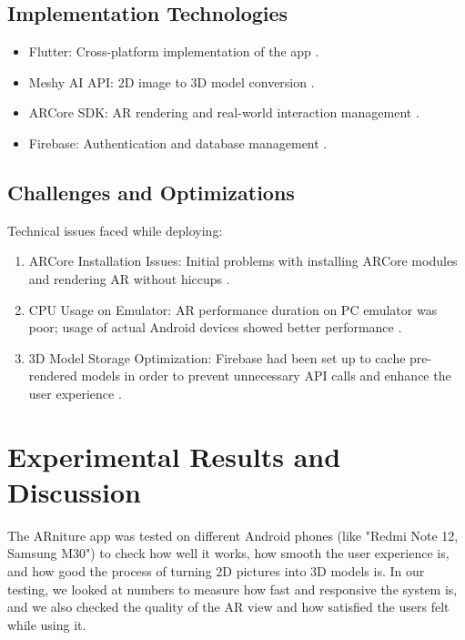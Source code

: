 \documentclass[12pt, a4paper]{article}
\begin{document}
\subsection{Implementation Technologies}
\begin{itemize}
    \item Flutter: Cross-platform implementation of the app \cite{ref3}.
    \item Meshy AI API: 2D image to 3D model conversion \cite{ref5}.
    \item ARCore SDK: AR rendering and real-world interaction management \cite{ref2}.
    \item Firebase: Authentication and database management \cite{ref4}.
\end{itemize}

\subsection{Challenges and Optimizations}
Technical issues faced while deploying:
\begin{enumerate}
    \item ARCore Installation Issues: Initial problems with installing ARCore modules and rendering AR without hiccups \cite{ref17}.
    \item CPU Usage on Emulator: AR performance duration on PC emulator was poor; usage of actual Android devices showed better performance \cite{ref9}.
    \item 3D Model Storage Optimization: Firebase had been set up to cache pre-rendered models in order to prevent unnecessary API calls and enhance the user experience \cite{ref19}.
\end{enumerate}

\section{Experimental Results and Discussion}
The ARniture app was tested on different Android phones (like "Redmi Note 12, Samsung M30") to check how well it works, how smooth the user experience is, and how good the process of turning 2D pictures into 3D models is. In our testing, we looked at numbers to measure how fast and responsive the system is, and we also checked the quality of the AR view and how satisfied the users felt while using it.
\end{document}

